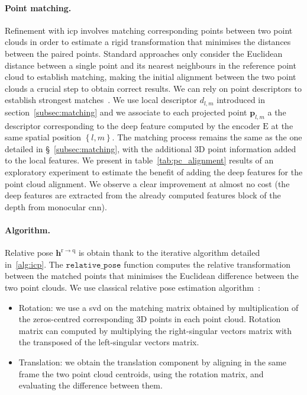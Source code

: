 \paragraph{Point matching.}
\label{para:pc_matching}
Refinement with \ac{icp} involves matching corresponding points between two point clouds in order to estimate a rigid transformation that minimises the distances between the paired points. Standard approaches only consider the Euclidean distance between a single point and its nearest neighbours in the reference point cloud to establish matching, making the initial alignment between the two point clouds a crucial step to obtain correct results. We can rely on point descriptors to establish strongest matches~\cite{Pomerleau2015}. We use local descriptor $d_{l,m}$ introduced in section~\ref{subsec:matching} and we associate to each projected point $\mathbf{p}_{l,m}$ a the descriptor corresponding to the deep feature computed by the encoder $\mathrm{E}$ at the same spatial position $\left\{l,m\right\}$. The matching process remains the same as the one detailed in \S~\ref{subsec:matching}, with the additional 3D point information added to the local features. We present in table~\ref{tab:pc_alignment} results of an exploratory experiment to estimate the benefit of adding the deep features for the point cloud alignment. We observe a clear improvement at almost no cost (the deep features are extracted from the already computed features block of the depth from monocular \ac{cnn}).  


\paragraph{Algorithm.} \label{para:pc_alignment} Relative pose $\mathbf{h}^\mathrm{r \rightarrow q}$ is obtain thank to the iterative algorithm detailed in~\ref{alg:icp}. The $\mathtt{relative\_pose}$ function computes the relative transformation between the matched points that minimises the Euclidean difference between the two point clouds. We use classical relative pose estimation algorithm~\citep{Pomerleau2015}:  
\begin{itemize}
	\item Rotation: we use a \ac{svd} on the matching matrix obtained by multiplication of the zeros-centred corresponding 3D points in each point cloud. Rotation matrix can computed by multiplying the right-singular vectors matrix with the transposed of the left-singular vectors matrix.
	\item Translation: we obtain the translation component by aligning in the same frame the two point cloud centroids, using the rotation matrix, and evaluating the difference between them.
\end{itemize}


